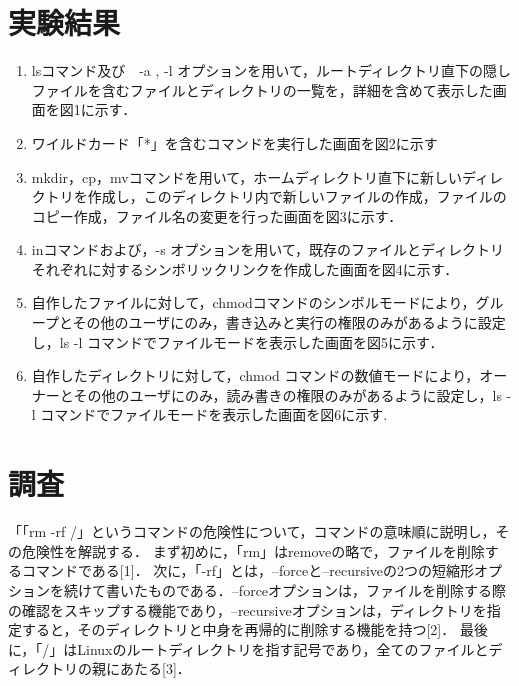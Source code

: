 \documentclass{jreport}  %
\begin{document}
\section{実験結果}
\begin{enumerate}[(1). ]
    \item lsコマンド及び　-a , -l オプションを用いて，ルートディレクトリ直下の隠しファイルを含むファイルとディレクトリの一覧を，詳細を含めて表示した画面を図1に示す．
    \item	ワイルドカード「*」を含むコマンドを実行した画面を図2に示す
    \item mkdir，cp，mvコマンドを用いて，ホームディレクトリ直下に新しいディレクトリを作成し，このディレクトリ内で新しいファイルの作成，ファイルのコピー作成，ファイル名の変更を行った画面を図3に示す．
    \item inコマンドおよび，-s オプションを用いて，既存のファイルとディレクトリそれぞれに対するシンボリックリンクを作成した画面を図4に示す．
    \item 自作したファイルに対して，chmodコマンドのシンボルモードにより，グループとその他のユーザにのみ，書き込みと実行の権限のみがあるように設定し，ls -l コマンドでファイルモードを表示した画面を図5に示す．
    \item 自作したディレクトリに対して，chmod コマンドの数値モードにより，オーナーとその他のユーザにのみ，読み書きの権限のみがあるように設定し，ls -l コマンドでファイルモードを表示した画面を図6に示す.
\end{enumerate}

\section{調査}
「「rm -rf /」というコマンドの危険性について，コマンドの意味順に説明し，その危険性を解説する．
まず初めに，「rm」はremoveの略で，ファイルを削除するコマンドである[1]．
次に，「-rf」とは，--forceと--recursiveの2つの短縮形オプションを続けて書いたものである．--forceオプションは，ファイルを削除する際の確認をスキップする機能であり，--recursiveオプションは，ディレクトリを指定すると，そのディレクトリと中身を再帰的に削除する機能を持つ[2]．
最後に，「/」はLinuxのルートディレクトリを指す記号であり，全てのファイルとディレクトリの親にあたる[3]．
\end{document}
